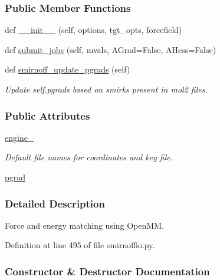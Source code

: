 \subsubsection*{Public Member Functions}
\begin{DoxyCompactItemize}
\item 
def \hyperlink{classsrc_1_1smirnoffio_1_1AbInitio__SMIRNOFF_ab5c3e12bd1cabe52601d1a5c96085d9d}{\+\_\+\+\_\+init\+\_\+\+\_\+} (self, options, tgt\+\_\+opts, forcefield)
\item 
def \hyperlink{classsrc_1_1smirnoffio_1_1AbInitio__SMIRNOFF_a77a4788e6fad28b4785c0900709cb72d}{submit\+\_\+jobs} (self, mvals, A\+Grad=False, A\+Hess=False)
\item 
def \hyperlink{classsrc_1_1smirnoffio_1_1AbInitio__SMIRNOFF_aba6c15a7fd233b8ec236dfa8551d1c93}{smirnoff\+\_\+update\+\_\+pgrads} (self)
\begin{DoxyCompactList}\small\item\em Update self.\+pgrads based on smirks present in mol2 files. \end{DoxyCompactList}\end{DoxyCompactItemize}
\subsubsection*{Public Attributes}
\begin{DoxyCompactItemize}
\item 
\hyperlink{classsrc_1_1smirnoffio_1_1AbInitio__SMIRNOFF_a34f149d11140ec32126c45bb62b381c9}{engine\+\_\+}
\begin{DoxyCompactList}\small\item\em Default file names for coordinates and key file. \end{DoxyCompactList}\item 
\hyperlink{classsrc_1_1smirnoffio_1_1AbInitio__SMIRNOFF_a22efc7006048e93f9ae37070e86c1abe}{pgrad}
\end{DoxyCompactItemize}


\subsubsection{Detailed Description}
Force and energy matching using Open\+MM. 



Definition at line 495 of file smirnoffio.\+py.



\subsubsection{Constructor \& Destructor Documentation}
\mbox{\label{classsrc_1_1smirnoffio_1_1AbInitio__SMIRNOFF_ab5c3e12bd1cabe52601d1a5c96085d9d}} 
